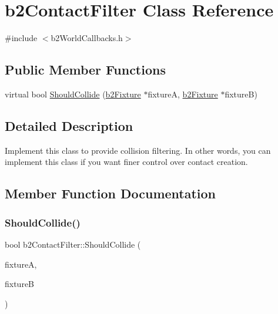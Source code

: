 \hypertarget{classb2_contact_filter}{}\section{b2\+Contact\+Filter Class Reference}
\label{classb2_contact_filter}


{\ttfamily \#include $<$b2\+World\+Callbacks.\+h$>$}

\subsection*{Public Member Functions}
\begin{DoxyCompactItemize}
\item 
virtual bool \hyperlink{classb2_contact_filter_aac8f6155d1f577d125db587f5269289b}{Should\+Collide} (\hyperlink{classb2_fixture}{b2\+Fixture} $\ast$fixtureA, \hyperlink{classb2_fixture}{b2\+Fixture} $\ast$fixtureB)
\end{DoxyCompactItemize}


\subsection{Detailed Description}
Implement this class to provide collision filtering. In other words, you can implement this class if you want finer control over contact creation. 

\subsection{Member Function Documentation}
\mbox{\label{classb2_contact_filter_aac8f6155d1f577d125db587f5269289b}} 
\subsubsection{\texorpdfstring{Should\+Collide()}{ShouldCollide()}}
{\footnotesize\ttfamily bool b2\+Contact\+Filter\+::\+Should\+Collide (\begin{DoxyParamCaption}\item[{\hyperlink{classb2_fixture}{b2\+Fixture} $\ast$}]{fixtureA,  }\item[{\hyperlink{classb2_fixture}{b2\+Fixture} $\ast$}]{fixtureB }\end{DoxyParamCaption})\hspace{0.3cm}{\ttfamily [virtual]}}

